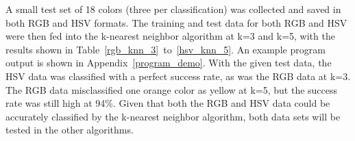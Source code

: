 \documentclass[twoside]{IEEEtran}
\begin{document}
A small test set of 18 colors (three per classification) was collected and saved in both RGB and
HSV formats. The training and test data for both RGB and HSV were then fed into the k-nearest
neighbor algorithm at k=3 and k=5, with the results shown in Table~\ref{rgb_knn_3}~to~\ref{hsv_knn_5}.
An example program output is shown in Appendix~\ref{program_demo}. With the given test data, the HSV data
was classified with a perfect success rate, as was the RGB data at k=3. The RGB data misclassified
one orange color as yellow at k=5, but the success rate was still high at 94\%. Given that both
the RGB and HSV data could be accurately classified by the k-nearest neighbor algorithm, both data
sets will be tested in the other algorithms.

\begin{table}[!t]
    \centering


\end{table}
\end{document}
